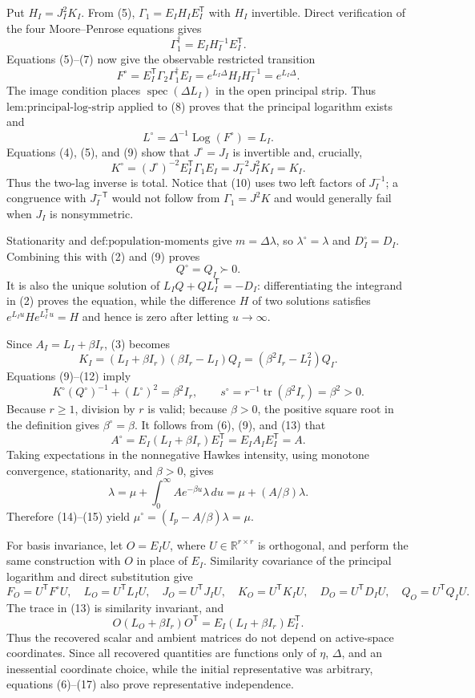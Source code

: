 Put \(H_I=J_I^2K_I\).  From (5), \(\Gamma_1=E_IH_IE_I^{\mathsf T}\) with \(H_I\) invertible.  Direct verification of the four Moore--Penrose equations gives
\[
 \Gamma_1^\dagger=E_IH_I^{-1}E_I^{\mathsf T}.
\tag{7}
\]
Equations (5)--(7) now give the observable restricted transition
\[
 F^\circ=E_I^{\mathsf T}\Gamma_2\Gamma_1^\dagger E_I
 =e^{L_I\Delta}H_IH_I^{-1}=e^{L_I\Delta}.
\tag{8}
\]
The image condition places \(\operatorname{spec}(\Delta L_I)\) in the open principal strip.  Thus \(\text{lem:principal-log-strip}\) applied to (8) proves that the principal logarithm exists and
\[
 L^\circ=\Delta^{-1}\operatorname{Log}(F^\circ)=L_I.
\tag{9}
\]
Equations (4), (5), and (9) show that \(J^\circ=J_I\) is invertible and, crucially,
\[
 K^\circ=(J^\circ)^{-2}E_I^{\mathsf T}\Gamma_1E_I
 =J_I^{-2}J_I^2K_I=K_I.
\tag{10}
\]
Thus the two-lag inverse is total.  Notice that (10) uses two left factors of \(J_I^{-1}\); a congruence with \(J_I^{-\mathsf T}\) would not follow from \(\Gamma_1=J^2K\) and would generally fail when \(J_I\) is nonsymmetric.

Stationarity and \(\text{def:population-moments}\) give \(m=\Delta\lambda\), so \(\lambda^\circ=\lambda\) and \(D_I^\circ=D_I\).  Combining this with (2) and (9) proves
\[
 Q^\circ=Q_I\succ0.
\tag{11}
\]
It is also the unique solution of \(L_IQ+QL_I^{\mathsf T}=-D_I\): differentiating the integrand in (2) proves the equation, while the difference \(H\) of two solutions satisfies \(e^{L_Iu}He^{L_I^{\mathsf T}u}=H\) and hence is zero after letting \(u\to\infty\).

Since \(A_I=L_I+\beta I_r\), (3) becomes
\[
 K_I=(L_I+\beta I_r)(\beta I_r-L_I)Q_I
     =(\beta^2I_r-L_I^2)Q_I.
\tag{12}
\]
Equations (9)--(12) imply
\[
 K^\circ(Q^\circ)^{-1}+(L^\circ)^2=\beta^2I_r,\qquad
 s^\circ=r^{-1}\operatorname{tr}(\beta^2I_r)=\beta^2>0.
\tag{13}
\]
Because \(r\geq1\), division by \(r\) is valid; because \(\beta>0\), the positive square root in the definition gives \(\beta^\circ=\beta\).  It follows from (6), (9), and (13) that
\[
 A^\circ=E_I(L_I+\beta I_r)E_I^{\mathsf T}=E_IA_IE_I^{\mathsf T}=A.
\tag{14}
\]
Taking expectations in the nonnegative Hawkes intensity, using monotone convergence, stationarity, and \(\beta>0\), gives
\[
 \lambda=\mu+\int_0^\infty Ae^{-\beta u}\lambda\,du
 =\mu+(A/\beta)\lambda.
\tag{15}
\]
Therefore (14)--(15) yield \(\mu^\circ=(I_p-A/\beta)\lambda=\mu\).

For basis invariance, let \(O=E_IU\), where \(U\in\mathbb R^{r\times r}\) is orthogonal, and perform the same construction with \(O\) in place of \(E_I\).  Similarity covariance of the principal logarithm and direct substitution give
\[
 F_O=U^{\mathsf T}F^\circ U,\quad L_O=U^{\mathsf T}L_IU,\quad
 J_O=U^{\mathsf T}J_IU,\quad K_O=U^{\mathsf T}K_IU,\quad
 D_O=U^{\mathsf T}D_IU,\quad Q_O=U^{\mathsf T}Q_IU.
\tag{16}
\]
The trace in (13) is similarity invariant, and
\[
 O(L_O+\beta I_r)O^{\mathsf T}=E_I(L_I+\beta I_r)E_I^{\mathsf T}.
\tag{17}
\]
Thus the recovered scalar and ambient matrices do not depend on active-space coordinates.  Since all recovered quantities are functions only of \(\eta\), \(\Delta\), and an inessential coordinate choice, while the initial representative was arbitrary, equations (6)--(17) also prove representative independence.

